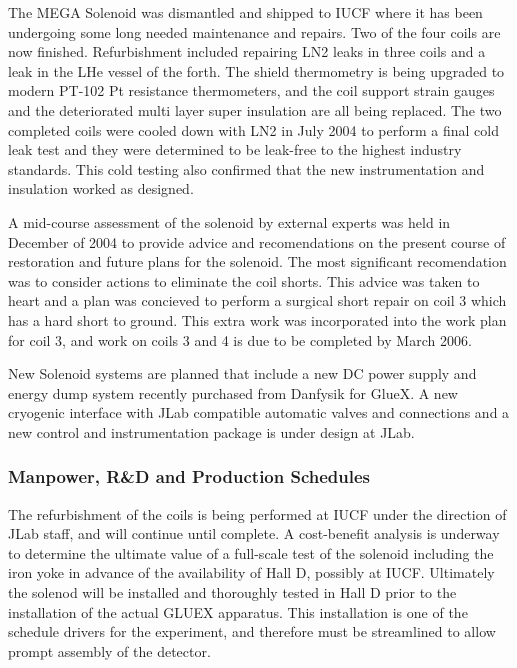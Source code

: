 The MEGA Solenoid was dismantled and shipped to IUCF where it has been 
undergoing some long needed maintenance and repairs. Two of the four
coils are now finished. Refurbishment included repairing LN2 leaks in three coils and a leak
in the LHe vessel of the forth. The shield thermometry is being upgraded to
modern PT-102 Pt resistance thermometers, and the coil support
strain gauges and the deteriorated multi layer super insulation are all being replaced.
The two completed coils were cooled down with
LN2 in July 2004 to perform a final cold leak test and they were
determined to be leak-free to the highest industry standards. This cold testing also 
confirmed that the new instrumentation and insulation worked as designed. 

A mid-course assessment of the solenoid by external experts was held in December of 2004 to
provide advice and recomendations on the present course of restoration and future 
plans for the solenoid. The most significant recomendation was to consider actions 
to eliminate the coil shorts. This advice was taken to heart and a plan was 
concieved to perform a surgical short repair on coil 3 which has a  
hard short to ground. This extra work was incorporated into the work plan for coil 3,
and work on coils 3 and 4 is due to be completed by March 2006.

New Solenoid systems are planned that include a new DC power
supply and energy dump system recently purchased from Danfysik for GlueX.
A new cryogenic interface with JLab compatible automatic valves and
connections and a new control and instrumentation package is under design at JLab.

\subsubsection*{Manpower, R\&D and Production Schedules}

The refurbishment of the coils is being performed at IUCF under
the direction of JLab staff, and will continue until complete.
A cost-benefit analysis is underway to determine the ultimate value 
of a full-scale test of the solenoid including the iron yoke 
in advance of the availability of Hall D, possibly at IUCF.
Ultimately the solenod will be installed and thoroughly tested in Hall D 
prior to the installation of the actual GLUEX apparatus. This installation
is one of the schedule drivers for the experiment, and therefore must be 
streamlined to allow prompt assembly of the detector.